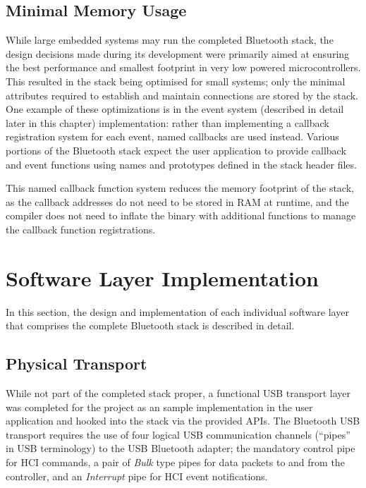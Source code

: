 \FloatBarrier
\subsection{Minimal Memory Usage}

While large embedded systems may run the completed Bluetooth stack, the design decisions made during its development were primarily aimed at ensuring the best performance and smallest footprint in very low powered microcontrollers. This resulted in the stack being optimised for small systems; only the minimal attributes required to establish and maintain connections are stored by the stack. One example of these optimizations is in the event system (described in detail later in this chapter) implementation: rather than implementing a callback registration system for each event, named callbacks are used instead. Various portions of the Bluetooth stack expect the user application to provide callback and event functions using names and prototypes defined in the stack header files.

This named callback function system reduces the memory footprint of the stack, as the callback addresses do not need to be stored in RAM at runtime, and the compiler does not need to inflate the binary with additional functions to manage the callback function registrations.

\section{Software Layer Implementation}

In this section, the design and implementation of each individual software layer that comprises the complete Bluetooth stack is described in detail.

\FloatBarrier
\subsection{Physical Transport}

While not part of the completed stack proper, a functional USB transport layer was completed for the project as an sample implementation in the user application and hooked into the stack via the provided APIs. The Bluetooth USB transport requires the use of four logical USB communication channels (``pipes'' in USB terminology) to the USB Bluetooth adapter; the mandatory control pipe for HCI commands, a pair of \textit{Bulk} type pipes for data packets to and from the controller, and an \textit{Interrupt} pipe for HCI event notifications.

